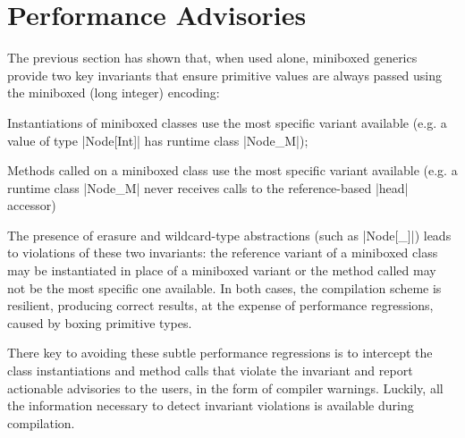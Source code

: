 \section{Performance Advisories}
\label{sec:advisories}

The previous section has shown that, when used alone, miniboxed generics provide two key invariants that ensure primitive values are always passed using the miniboxed (long integer) encoding:

\begin{compactitem}
\item Instantiations of miniboxed classes use the most specific variant available (e.g. a value of type |Node[Int]| has runtime class |Node_M|);
\item Methods called on a miniboxed class use the most specific variant available (e.g. a runtime class |Node_M| never receives calls to the reference-based |head| accessor)
\end{compactitem}

The presence of erasure and wildcard-type abstractions (such as |Node[_]|) leads to violations of these two invariants: the reference variant of a miniboxed class may be instantiated in place of a miniboxed variant or the method called may not be the most specific one available. In both cases, the compilation scheme is resilient, producing correct results, at the expense of performance regressions, caused by boxing primitive types.

There key to avoiding these subtle performance regressions is to intercept the class instantiations and method calls that violate the invariant and report actionable advisories to the users, in the form of compiler warnings. Luckily, all the information necessary to detect invariant violations is available during compilation.



